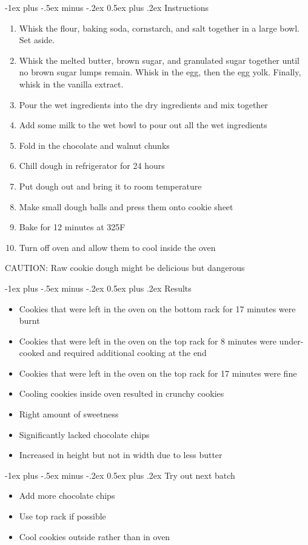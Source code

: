 \documentclass[10pt,landscape]{article}
\makeatletter
\renewcommand{\section}{\@startsection{section}{1}{0mm}%
                                {-1ex plus -.5ex minus -.2ex}%
                                {0.5ex plus .2ex}%
                                {\normalfont\large\bfseries}}
\makeatother
\begin{document}
\begin{multicols}{3}
\section{Instructions}
\begin{enumerate}
    \item Whisk the flour, baking soda, cornstarch, and salt together in a large bowl. Set aside.
    \item Whisk the melted butter, brown sugar, and granulated sugar together until no brown sugar lumps remain. Whisk in the egg, then the egg yolk. Finally, whisk in the vanilla extract.
    \item Pour the wet ingredients into the dry ingredients and mix together
    \item Add some milk to the wet bowl to pour out all the wet ingredients
    \item Fold in the chocolate and walnut chunks
    \item Chill dough in refrigerator for 24 hours
    \item Put dough out and bring it to room temperature
    \item Make small dough balls and press them onto cookie sheet
    \item Bake for 12 minutes at 325\textdegree F
    \item Turn off oven and allow them to cool inside the oven
\end{enumerate}
\bigskip
CAUTION: Raw cookie dough might be delicious but dangerous
\vfill\null
\columnbreak
 
\section{Results}
\begin{itemize}
    \item Cookies that were left in the oven on the bottom rack for 17 minutes were burnt
    \item Cookies that were left in the oven on the top rack for 8 minutes were under-cooked and required additional cooking at the end
    \item Cookies that were left in the oven on the top rack for 17 minutes were fine
    \item Cooling cookies inside oven resulted in crunchy cookies
    \item Right amount of sweetness 
    \item Significantly lacked chocolate chips
    \item Increased in height but not in width due to less butter
\end{itemize}
\bigskip
\section{Try out next batch}
\begin{itemize}
    \item Add more chocolate chips
    \item Use top rack if possible
    \item Cool cookies outside rather than in oven
\end{itemize}
\vfill\null
\columnbreak
\end{multicols}
\end{document}
